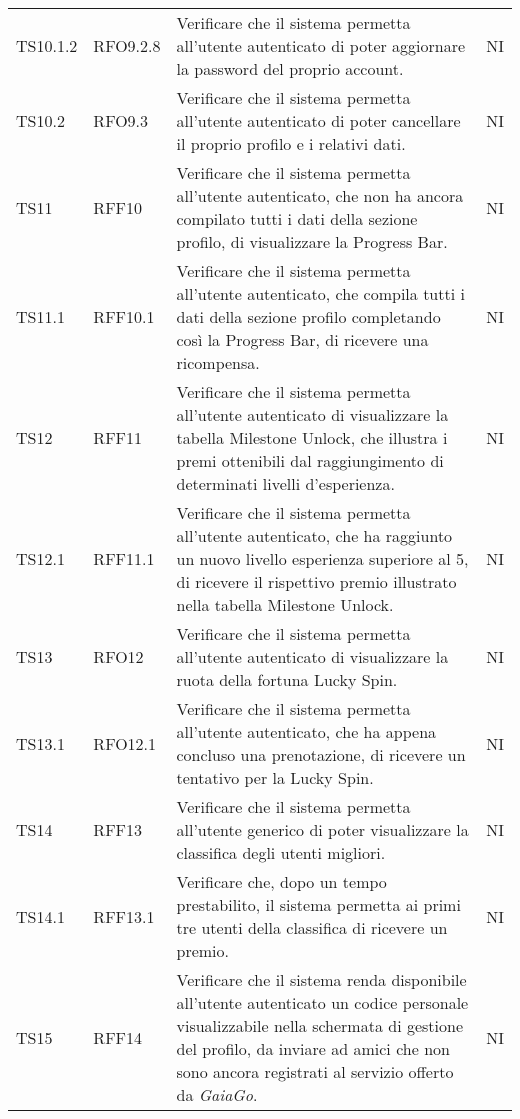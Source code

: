 \begin{longtable}{ >{\centering}p{} >{\centering}p{} >{\centering}p{}
			>{\centering}p{}}
		TS10.1.2	& RFO9.2.8 &	Verificare che il sistema permetta all'utente autenticato di poter aggiornare la password del proprio account. 	&	NI	\tabularnewline 
		
		TS10.2 & RFO9.3 	&	Verificare che il sistema permetta all'utente autenticato di poter cancellare il proprio profilo e i relativi dati. 	&	NI	\tabularnewline
		
		 TS11 & RFF10	&	Verificare che il sistema permetta all'utente autenticato, che non ha ancora compilato tutti i dati della sezione profilo, di visualizzare la Progress Bar. 	&	NI	\tabularnewline
		 
		 TS11.1	& RFF10.1 & Verificare che il sistema permetta all'utente autenticato, che compila tutti i dati della sezione profilo completando così la Progress Bar, di ricevere una ricompensa. 	&	NI	\tabularnewline
		 
		 TS12	& RFF11 &	Verificare che il sistema permetta all'utente autenticato di visualizzare la tabella Milestone Unlock\glo, che illustra i premi ottenibili dal raggiungimento di determinati livelli d'esperienza. 	&	NI	\tabularnewline	
		 	 
		 TS12.1	& RFF11.1 &	Verificare che il sistema permetta all'utente autenticato, che ha raggiunto un nuovo livello esperienza superiore al 5, di ricevere il rispettivo premio illustrato nella tabella Milestone Unlock\glo. 	&	NI	\tabularnewline
		 
		 TS13 & RFO12 &	Verificare che il sistema permetta all'utente autenticato di visualizzare la ruota della fortuna Lucky Spin\glo. 	&	NI	\tabularnewline		
		  
		 TS13.1	& RFO12.1 &	Verificare che il sistema permetta all'utente autenticato, che ha appena concluso una prenotazione, di ricevere un tentativo per la Lucky Spin\glo. 	&	NI	\tabularnewline	
		 
		  TS14	& RFF13 &	Verificare che il sistema permetta all'utente generico di poter visualizzare la classifica degli utenti migliori. 	&	NI	\tabularnewline	
		  
		 TS14.1	& RFF13.1 & Verificare che, dopo un tempo prestabilito, il sistema permetta ai primi tre utenti della classifica di ricevere un premio.	&	NI	\tabularnewline	
		 
		 TS15	& RFF14 &	Verificare che il sistema renda disponibile all'utente autenticato un codice personale visualizzabile nella schermata di gestione del profilo, da inviare ad amici che non sono ancora registrati al servizio offerto da \textit{GaiaGo}.  	&	NI	\tabularnewline
		 

\end{longtable}
